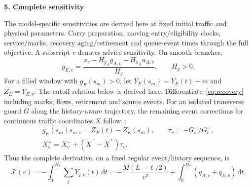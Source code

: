 \documentclass[10pt,a4paper]{article}
\newcommand{\dd}{\,\mathrm d}
\newcommand{\head}[1]{\par\vspace{4pt}\noindent\textbf{#1}\par\nobreak\vspace{1pt}}
\begin{document}
\newpage
\head{5. Complete sensitivity}
The model-specific sensitivities are derived here at fixed initial traffic
and physical parameters. Carry preparation, moving entry/eligibility clocks,
service/marks, recovery aging/retirement and queue-event times through the
full objective. A subscript $v$ denotes advice sensitivity. On smooth branches,
\begin{equation}
 g_{E,v}=\frac{x_v-H_{g_A}g_{A,v}-H_{u_A}u_{A,v}}{H_g},\qquad H_g>0.
 \label{eq:rootgradient}
\end{equation}
For a filled window with $g_E(s_m)>0$, let $Y_E(s_m)=Y_E(t)-m$ and $Z_E=Y_{E,v}$.
The cutoff relation below is derived here. Differentiate~\eqref{eq:recovery}
including marks, flows, retirement and source events. For an isolated
transverse guard $G$ along the history-aware trajectory, the remaining
event corrections for continuous traffic coordinates $X$ follow~\cite{kong}:
\begin{equation}
 \begin{gathered}
 g_E(s_m)s_{m,v}=Z_E(t)-Z_E(s_m),\qquad \tau_v=-G_v^-/G_t^-,\\
 X_v^+=X_v^-+(\dot X^- -\dot X^+)\tau_v.
 \end{gathered}
 \label{eq:eventgradient}
\end{equation}
Thus the complete derivative, on a fixed regular event/history sequence, is
\begin{equation}
 J'(v)=-\int_0^{H_*}\!\sum_jY_{j,v}(t)\dd t
 =-\frac{M(L-\ell/2)}{v^2}+\int_0^{H_*}(q_{A,v}+q_{E,v})\dd t.
 \label{eq:objectivegradient}
\end{equation}
\makeatletter
\renewcommand{\section}{\@ifstar{\head}{\head}}
\makeatother
\end{document}
